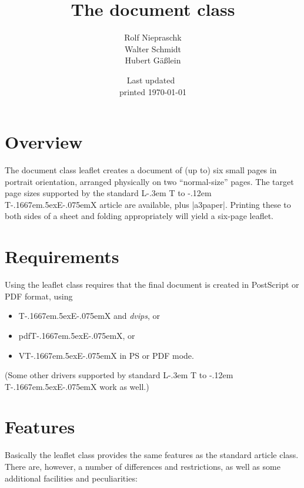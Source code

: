 \documentclass[
]{leaflet}
\title{The document class \Lclass{leaflet}}
\author{%
  Rolf Niepraschk\\
  Walter Schmidt\\
  Hubert G\"a\ss lein}
\date{Last updated~\docdate\\printed \today}
\makeatletter
\def\ptmTeX{T\kern-.1667em\lower.5ex\hbox{E}\kern-.075emX\@}
\DeclareRobustCommand{\ptmLaTeX}{L\kern-.3em
        {\setbox0\hbox{T}%
         \vbox to\ht0{\hbox{%
                            \csname S@\f@size\endcsname
                            \fontsize\sf@size\z@
                            \math@fontsfalse\selectfont
                            A}%
                      \vss}%
        }%
        \kern-.12em
        \ptmTeX}
\let\TeX=\ptmTeX
\let\LaTeX=\ptmLaTeX
\newcommand\Lclass[1]{\textsf{#1}}
\newcommand\Lprog[1]{\textit{#1}}
\makeatother
\begin{document}
\maketitle



\section{Overview}

The document class \Lclass{leaflet} creates a document of (up to) six
small pages in portrait orientation, arranged physically on two
``normal-size'' pages. The target page sizes supported by the standard
\LaTeX{}  \Lclass{article} are available, plus |a3paper|. Printing these
to both sides of a sheet and folding appropriately will yield a six-page
leaflet.

\onecolumn
\twocolumn[WWW]

\section{Requirements}

Using the \Lclass{leaflet} class requires that the final
document is created in PostScript or PDF format, using
\begin{itemize}
  \item \TeX{} and \Lprog{dvips}, or
  \item pdf\TeX{}, or
  \item V\TeX{} in PS or PDF mode.
\end{itemize}
(Some other drivers supported by standard \LaTeX{} work as well.)

\section{Features}

Basically the \Lclass{leaflet} class provides the same features as the
standard \Lclass{article} class. There are, however, a number of
differences and restrictions, as well as some additional facilities and
peculiarities:
\end{document}
